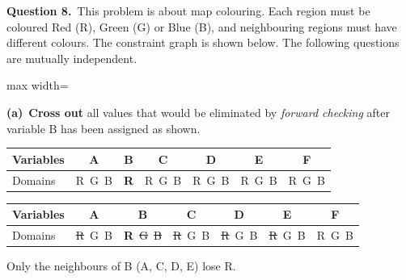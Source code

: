 \documentclass[11pt,a4paper]{article}
\newcommand{\question}[1]{\par\medskip\noindent\textbf{Question #1.}\ }
\newcommand{\subq}[1]{\par\smallskip\noindent\textbf{#1}\ }
\begin{document}
\question{8}This problem is about map colouring. Each region must be coloured Red (R), Green (G) or Blue (B), and neighbouring regions must have different colours. The constraint graph is shown below. The following questions are mutually independent.\begin{center}
\begin{adjustbox}{max width=\linewidth}
\end{adjustbox}
\end{center}
\subq{(a)}\textbf{Cross out} all values that would be eliminated by \emph{forward checking} after variable B has been assigned as shown.\begin{center}\small\begin{tabular}{|l|c|c|c|c|c|c|}\hline Variables & \textbf{A} & \textbf{B} & \textbf{C} & \textbf{D} & \textbf{E} & \textbf{F}\\ \hline Domains & R\ G\ B & \textbf{R} & R\ G\ B & R\ G\ B & R\ G\ B & R\ G\ B\\ \hline\end{tabular}\end{center}
\begin{solbox}
\begin{center}\small\begin{tabular}{|l|c|c|c|c|c|c|}\hline Variables & \textbf{A} & \textbf{B} & \textbf{C} & \textbf{D} & \textbf{E} & \textbf{F}\\ \hline Domains & \textcolor{red!70!black}{\sout{R}}\ G\ B & \textbf{R}\ \textcolor{red!70!black}{\sout{G}}\ \textcolor{red!70!black}{\sout{B}} & \textcolor{red!70!black}{\sout{R}}\ G\ B & \textcolor{red!70!black}{\sout{R}}\ G\ B & \textcolor{red!70!black}{\sout{R}}\ G\ B & R\ G\ B\\ \hline\end{tabular}\end{center}Only the neighbours of B (A, C, D, E) lose R.
\end{solbox}
\end{document}
